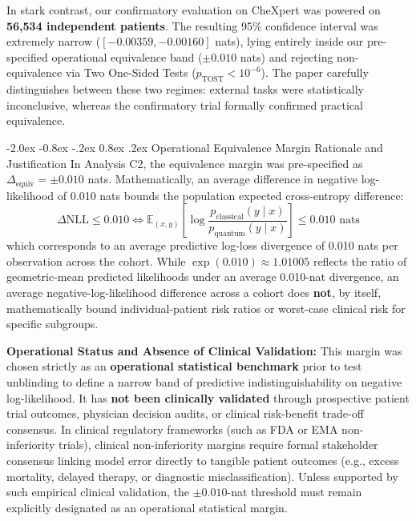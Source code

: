 \documentclass[10pt,a4paper]{article}
\makeatletter
\renewcommand{\subsection}{\@startsection{subsection}{2}{\z@}%
  {-2.0ex \@plus -0.8ex \@minus -.2ex}%
  {0.8ex \@plus.2ex}%
  {\normalfont\large\sffamily\bfseries\color{naturedark}}}
\makeatother
\begin{document}
In stark contrast, our confirmatory evaluation on CheXpert was powered on \textbf{56,534 independent patients}. The resulting 95\% confidence interval was extremely narrow ($[-0.00359, -0.00160]$ nats), lying entirely inside our pre-specified operational equivalence band ($\pm 0.010$ nats) and rejecting non-equivalence via Two One-Sided Tests ($p_{\text{TOST}} < 10^{-6}$). The paper carefully distinguishes between these two regimes: external tasks were statistically inconclusive, whereas the confirmatory trial formally confirmed practical equivalence.

\subsection{Operational Equivalence Margin Rationale and Justification}
In Analysis C2, the equivalence margin was pre-specified as $\Delta_{\text{equiv}} = \pm 0.010$ nats. Mathematically, an average difference in negative log-likelihood of 0.010 nats bounds the population expected cross-entropy difference:
\begin{equation}
\Delta\text{NLL} \le 0.010 \iff \mathbb{E}_{(x, y)}\left[\log \frac{p_{\text{classical}}(y \mid x)}{p_{\text{quantum}}(y \mid x)}\right] \le 0.010 \text{ nats}
\end{equation}
which corresponds to an average predictive log-loss divergence of 0.010 nats per observation across the cohort. While $\exp(0.010) \approx 1.01005$ reflects the ratio of geometric-mean predicted likelihoods under an average 0.010-nat divergence, an average negative-log-likelihood difference across a cohort does \textbf{not}, by itself, mathematically bound individual-patient risk ratios or worst-case clinical risk for specific subgroups.

\textbf{Operational Status and Absence of Clinical Validation:} This margin was chosen strictly as an \textbf{operational statistical benchmark} prior to test unblinding to define a narrow band of predictive indistinguishability on negative log-likelihood. It has \textbf{not been clinically validated} through prospective patient trial outcomes, physician decision audits, or clinical risk-benefit trade-off consensus. In clinical regulatory frameworks (such as FDA or EMA non-inferiority trials), clinical non-inferiority margins require formal stakeholder consensus linking model error directly to tangible patient outcomes (e.g., excess mortality, delayed therapy, or diagnostic misclassification). Unless supported by such empirical clinical validation, the $\pm 0.010$-nat threshold must remain explicitly designated as an operational statistical margin.
\end{document}
